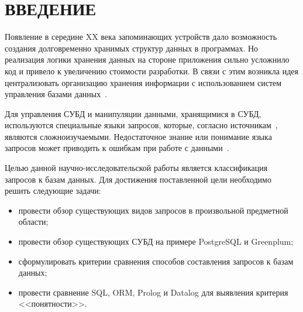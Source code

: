 \chapter*{ВВЕДЕНИЕ}

Появление в середине XX века запоминающих устройств дало возможность создания долговременно хранимых структур данных в программах. Но реализация логики хранения данных на стороне приложения сильно усложнило код и привело к увеличению стоимости разработки. В связи с этим возникла идея централизовать организацию хранения информации с использованием систем управления базами данных~\cite{стасышин2022проектирование}.

Для управления СУБД и манипуляции данными, хранящимися в СУБД, используются специальные языки запросов, которые, согласно источникам~\cite{невский2022применение}\cite{katsogiannis2023survey}, являются сложноизучаемыми. Недостаточное знание или понимание языка запросов может приводить к ошибкам при работе с данными~\cite{гарскова2005базы}.

Целью данной научно-исследовательской работы является классификация запросов к базам данных. Для достижения поставленной цели необходимо решить следующие задачи:

\begin{itemize}
	\item провести обзор существующих видов запросов в произвольной предметной области;
	\item провести обзор существующих СУБД на примере PostgreSQL и Greenplum;
	\item сформулировать критерии сравнения способов составления запросов к базам данных;
	\item провести сравнение SQL, ORM, Prolog и Datalog для выявления критерия <<понятности>>.
\end{itemize}

